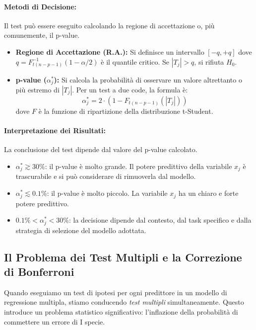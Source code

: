 \paragraph{Metodi di Decisione:} Il test può essere eseguito calcolando la regione di accettazione o, più comunemente, il p-value.

\begin{itemize}
    \item \textbf{Regione di Accettazione (R.A.):} Si definisce un intervallo \([-q, +q]\) dove \(q = F_{t(n-p-1)}^{-1}(1-\alpha/2)\) è il quantile critico. Se \(|T_j| > q\), si rifiuta \(H_0\).
    \item \textbf{p-value (\(\alpha_j^*\)):} Si calcola la probabilità di osservare un valore altrettanto o più estremo di \(|T_j|\). Per un test a due code, la formula è:
    \[
        \alpha_j^* = 2 \cdot (1 - F_{t(n-p-1)}(|T_j|))
    \]
    dove \(F\) è la funzione di ripartizione della distribuzione t-Student.
\end{itemize}

\paragraph{Interpretazione dei Risultati:} La conclusione del test dipende dal valore del p-value calcolato.
\begin{itemize}
    \item \(\alpha_j^* \gtrsim 30\%\): il p-value è molto grande. Il potere predittivo della variabile \(x_j\) è trascurabile e si può considerare di rimuoverla dal modello.
    \item \(\alpha_j^* \lesssim 0.1\%\): il p-value è molto piccolo. La variabile \(x_j\) ha un chiaro e forte potere predittivo.
    \item \(0.1\% < \alpha_j^* < 30\%\): la decisione dipende dal contesto, dal task specifico e dalla strategia di selezione del modello adottata.
\end{itemize}


\subsection{Il Problema dei Test Multipli e la Correzione di Bonferroni}

Quando eseguiamo un test di ipotesi per ogni predittore in un modello di regressione multipla, stiamo conducendo \textit{test multipli} simultaneamente. Questo introduce un problema statistico significativo: l'inflazione della probabilità di commettere un errore di I specie.

